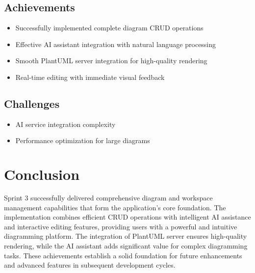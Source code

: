 \subsection{Achievements}
\begin{itemize}
    \item Successfully implemented complete diagram CRUD operations
    \item Effective AI assistant integration with natural language processing
    \item Smooth PlantUML server integration for high-quality rendering
    \item Real-time editing with immediate visual feedback
\end{itemize}

\subsection{Challenges}
\begin{itemize}
    \item AI service integration complexity
    \item Performance optimization for large diagrams
\end{itemize}



\section{Conclusion}

Sprint 3 successfully delivered comprehensive diagram and workspace management capabilities that form the application's core foundation. The implementation combines efficient CRUD operations with intelligent AI assistance and interactive editing features, providing users with a powerful and intuitive diagramming platform. The integration of PlantUML server ensures high-quality rendering, while the AI assistant adds significant value for complex diagramming tasks. These achievements establish a solid foundation for future enhancements and advanced features in subsequent development cycles.